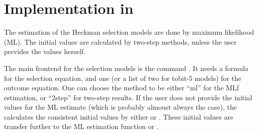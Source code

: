
\section[Implementation]{Implementation in }

The estimation of the Heckman selection models are done by maximum
likelihood (ML).  The initial values are calculated by two-step methods,
unless the user prevides the values herself.  

The main frontend for the selection models is the command
.  It needs a formula for the selection equation, and
one (or a list of two for tobit-5 models) for the outcome equation.
One can choose the method to be either ``ml'' for the MLf estimation,
or ``2step'' for two-step results.  If the user does not provide the
initial values for the ML estimate (which is probably almoust always
the case), the  calculates the consistent initial
values by either  or .  These initial
values are transfer further to the ML estimation function
 or .
